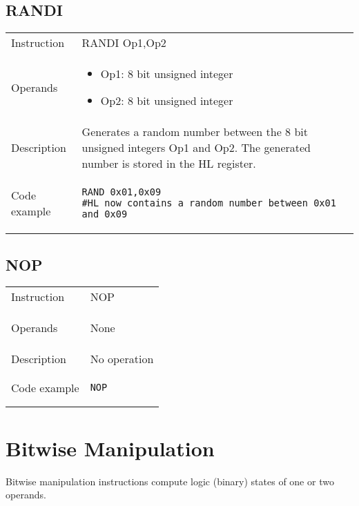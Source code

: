 \subsection{RANDI}
\renewcommand*{\arraystretch}{2.0}
\begin{longtable}{P{3cm}P{9cm}}
\midrule
\noindent Instruction & RANDI Op1,Op2 \\
\noindent Operands &
\begin{itemize}[label={},noitemsep,leftmargin=*,topsep=0pt,partopsep=0pt, itemsep=1em]
\item Op1: 8 bit unsigned integer
\item Op2: 8 bit unsigned integer
\end{itemize}\\
\noindent Description & Generates a random number between the 8 bit unsigned integers Op1 and Op2. The generated number is stored in the HL register.
	 \\
\noindent Code example & 
\begin{lstlisting}
RAND 0x01,0x09
#HL now contains a random number between 0x01 and 0x09
\end{lstlisting} \\
\end{longtable}

\newpage

\subsection{NOP}
\renewcommand*{\arraystretch}{2.0}
\begin{longtable}{P{3cm}P{9cm}}
\midrule
\noindent Instruction & NOP \\
\noindent Operands &
\begin{itemize}[label={},noitemsep,leftmargin=*,topsep=0pt,partopsep=0pt, itemsep=1em]None\end{itemize}\\
\noindent Description & No operation \\
\noindent Code example & 
\begin{lstlisting}
NOP
\end{lstlisting} \\
\end{longtable}


\newpage

\section{Bitwise Manipulation}
Bitwise manipulation instructions compute logic (binary) states of one or two operands.

